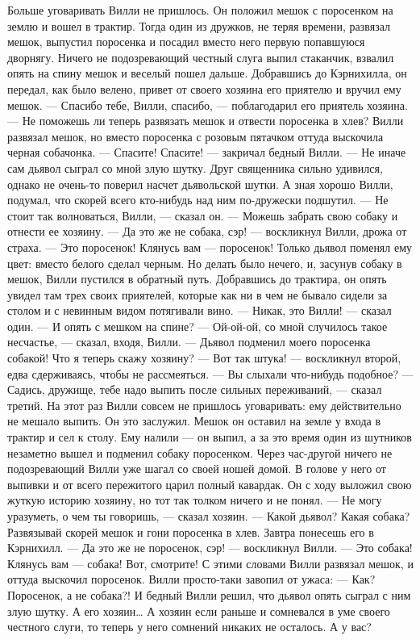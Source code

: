 \documentclass[12pt]{article}
\begin{document}
Больше уговаривать Вилли не пришлось. Он положил мешок с поросенком на землю и вошел в трактир. Тогда один из дружков, не теряя времени, развязал мешок, выпустил поросенка и посадил вместо него первую попавшуюся дворнягу.
Ничего не подозревающий честный слуга выпил стаканчик, взвалил опять на спину мешок и веселый пошел дальше. Добравшись до Кэрнихилла, он передал, как было велено, привет от своего хозяина его приятелю и вручил ему мешок.
— Спасибо тебе, Вилли, спасибо, — поблагодарил его приятель хозяина. — Не поможешь ли теперь развязать мешок и отвести поросенка в хлев?
Вилли развязал мешок, но вместо поросенка с розовым пятачком оттуда выскочила черная собачонка.
— Спасите! Спасите! — закричал бедный Вилли. — Не иначе сам дьявол сыграл со мной злую шутку.
Друг священника сильно удивился, однако не очень-то поверил насчет дьявольской шутки. А зная хорошо Вилли, подумал, что скорей всего кто-нибудь над ним по-дружески подшутил.
— Не стоит так волноваться, Вилли, — сказал он. — Можешь забрать свою собаку и отнести ее хозяину.
— Да это же не собака, сэр! — воскликнул Вилли, дрожа от страха. — Это поросенок! Клянусь вам — поросенок! Только дьявол поменял ему цвет: вместо белого сделал черным.
Но делать было нечего, и, засунув собаку в мешок, Вилли пустился в обратный путь. Добравшись до трактира, он опять увидел там трех своих приятелей, которые как ни в чем не бывало сидели за столом и с невинным видом потягивали вино.
— Никак, это Вилли! — сказал один. — И опять с мешком на спине?
— Ой-ой-ой, со мной случилось такое несчастье, — сказал, входя, Вилли. — Дьявол подменил моего поросенка собакой! Что я теперь скажу хозяину?
— Вот так штука! — воскликнул второй, едва сдерживаясь, чтобы не рассмеяться. — Вы слыхали что-нибудь подобное?
— Садись, дружище, тебе надо выпить после сильных переживаний, — сказал третий.
На этот раз Вилли совсем не пришлось уговаривать: ему действительно не мешало выпить. Он это заслужил.
Мешок он оставил на земле у входа в трактир и сел к столу. Ему налили — он выпил, а за это время один из шутников незаметно вышел и подменил собаку поросенком.
Через час-другой ничего не подозревающий Вилли уже шагал со своей ношей домой. В голове у него от выпивки и от всего пережитого царил полный кавардак. Он с ходу выложил свою жуткую историю хозяину, но тот так толком ничего и не понял.
— Не могу уразуметь, о чем ты говоришь, — сказал хозяин. — Какой дьявол? Какая собака? Развязывай скорей мешок и гони поросенка в хлев. Завтра понесешь его в Кэрнихилл.
— Да это же не поросенок, сэр! — воскликнул Вилли. — Это собака! Клянусь вам — собака! Вот, смотрите!
С этими словами Вилли развязал мешок, и оттуда выскочил поросенок. Вилли просто-таки завопил от ужаса:
— Как? Поросенок, а не собака?!
И бедный Вилли решил, что дьявол опять сыграл с ним злую шутку. А его хозяин…
А хозяин если раньше и сомневался в уме своего честного слуги, то теперь у него сомнений никаких не осталось.
А у вас?
\end{document}
